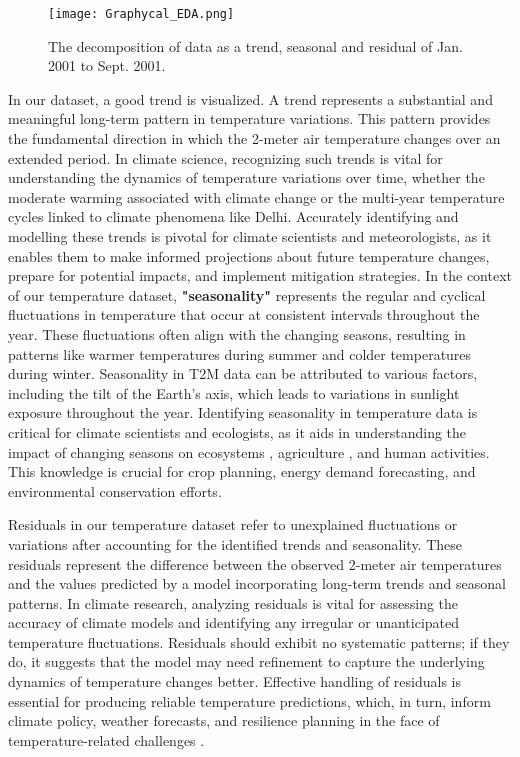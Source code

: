 \begin{figure}[ht!]
\centering
\texttt{[image: Graphycal\_EDA.png]}
\caption{The decomposition of data as a trend, seasonal and residual of Jan. 2001 to Sept. 2001. }
\label{fig:graphycalEDA}
\end{figure}
In our dataset, a good trend is visualized. A trend represents a substantial and meaningful long-term pattern in temperature variations. This pattern provides the fundamental direction in which the 2-meter air temperature changes over an extended period. In climate science, recognizing such trends is vital for understanding the dynamics of temperature variations over time, whether the moderate warming associated with climate change or the multi-year temperature cycles linked to climate phenomena like Delhi. Accurately identifying and modelling these trends is pivotal for climate scientists and meteorologists, as it enables them to make informed projections about future temperature changes, prepare for potential impacts, and implement mitigation strategies.
In the context of our temperature dataset, \textbf{"seasonality"} represents the regular and cyclical fluctuations in temperature that occur at consistent intervals throughout the year. These fluctuations often align with the changing seasons, resulting in patterns like warmer temperatures during summer and colder temperatures during winter. Seasonality in T2M data can be attributed to various factors, including the tilt of the Earth's axis, which leads to variations in sunlight exposure throughout the year. Identifying seasonality in temperature data is critical for climate scientists and ecologists, as it aids in understanding the impact of changing seasons on ecosystems \cite{liu2021modeling}, agriculture \cite{murugesan2021deep}, and human activities. This knowledge is crucial for crop planning\cite{sehgal2017crop}, energy demand forecasting\cite{choi2020power}, and environmental conservation efforts\cite{lee2017using}.

Residuals in our temperature dataset refer to unexplained fluctuations or variations after accounting for the identified trends and seasonality. These residuals represent the difference between the observed 2-meter air temperatures and the values predicted by a model incorporating long-term trends and seasonal patterns. In climate research, analyzing residuals is vital for assessing the accuracy of climate models and identifying any irregular or unanticipated temperature fluctuations. Residuals should exhibit no systematic patterns; if they do, it suggests that the model may need refinement to capture the underlying dynamics of temperature changes better. Effective handling of residuals is essential for producing reliable temperature predictions, which, in turn, inform climate policy\cite{gilik2022air}, weather forecasts\cite{shin2021short}, and resilience planning\cite{ghaith2022synchronization} in the face of temperature-related challenges \cite{lee2020forecasting}.



